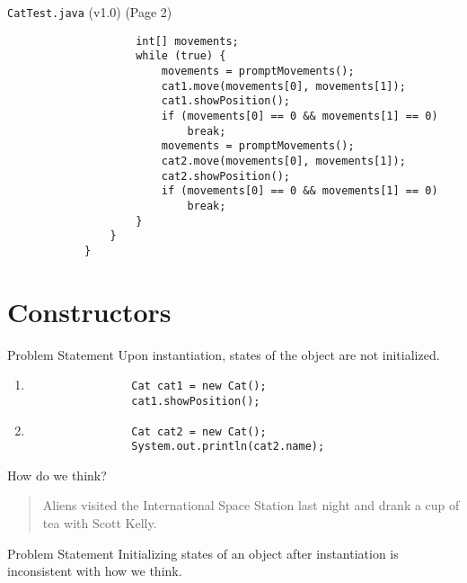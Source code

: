 \documentclass[10pt, compress]{beamer}
\begin{document}
\begin{slide}
	\begin{block}{\texttt{CatTest.java} (v1.0) (Page 2)}
		\begin{verbatim}
			        int[] movements;
			        while (true) {
			            movements = promptMovements();
			            cat1.move(movements[0], movements[1]);
			            cat1.showPosition();
			            if (movements[0] == 0 && movements[1] == 0)
			                break;
			            movements = promptMovements();
			            cat2.move(movements[0], movements[1]);
			            cat2.showPosition();
			            if (movements[0] == 0 && movements[1] == 0)
			                break;
			        }
			    }
			}
		\end{verbatim}
	\end{block}
\end{slide}

\section{Constructors}

\begin{slide}
	\begin{block}{Problem Statement}
		Upon instantiation, states of the object are not initialized.
		\begin{enumerate}
			\item
			\begin{verbatim}
				Cat cat1 = new Cat();
				cat1.showPosition();
			\end{verbatim}
			\item
			\begin{verbatim}
				Cat cat2 = new Cat();
				System.out.println(cat2.name);
			\end{verbatim}
		\end{enumerate}
	\end{block}
\end{slide}

\begin{slide}
	\begin{block}{How do we think?}
		\begin{quote}
		Aliens visited the International Space Station last night and drank a cup of tea with Scott Kelly.
		\end{quote}
	\end{block}
	\pause
	\begin{block}{Problem Statement}
		Initializing states of an object after instantiation is inconsistent with how we think.
	\end{block}
\end{slide}
\end{document}
